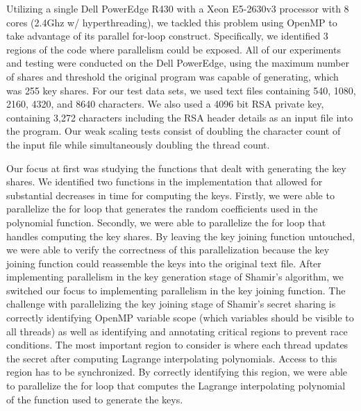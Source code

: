 \documentclass[main.tex]{subfiles}
\begin{document}
\indent Utilizing a single Dell PowerEdge R430 with a Xeon E5-2630v3 processor with 8 cores (2.4Ghz w/ hyperthreading), we tackled this problem using OpenMP to take advantage of its parallel for-loop construct. Specifically, we identified 3 regions of the code where parallelism could be exposed. All of our experiments and testing were conducted on the Dell PowerEdge, using the maximum number of shares and threshold the original program was capable of generating, which was 255 key shares.  For our test data sets, we used text files containing 540, 1080, 2160, 4320, and 8640 characters.  We also used a 4096 bit RSA private key, containing 3,272 characters including the RSA header details as an input file into the program.  Our weak scaling tests consist of doubling the character count of the input file while simultaneously doubling the thread count.

\indent Our focus at first was studying the functions that dealt with generating the key shares. We identified two functions in the implementation that allowed for substantial decreases in time for computing the keys.  Firstly, we were able to parallelize the for loop that generates the random coefficients used in the polynomial function.  Secondly, we were able to parallelize the for loop that handles computing the key shares.  By leaving the key joining function untouched, we were able to verify the correctness of this parallelization because the key joining function could reassemble the keys into the original text file.
\indent After implementing parallelism in the key generation stage of Shamir's algorithm, we switched our focus to implementing parallelism in the key joining function.  The challenge with parallelizing the key joining stage of Shamir's secret sharing is correctly identifying OpenMP variable scope (which variables should be visible to all threads) as well as identifying and annotating critical regions to prevent race conditions. The most important region to consider is where each thread updates the secret after computing Lagrange interpolating polynomials.  Access to this region has to be synchronized. By correctly identifying this region, we were able to parallelize the for loop that computes the Lagrange interpolating polynomial of the function used to generate the keys.  
\end{document}
